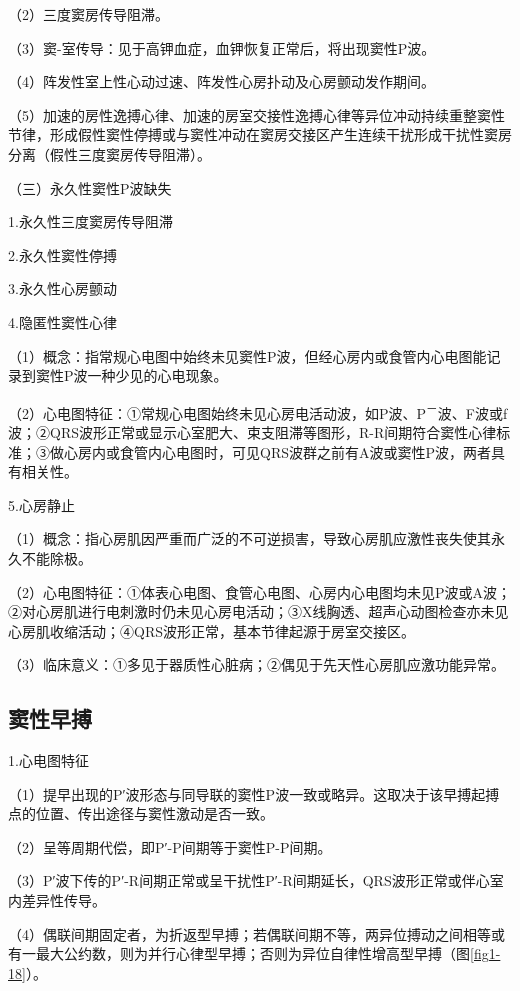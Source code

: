 （2）三度窦房传导阻滞。

（3）窦-室传导：见于高钾血症，血钾恢复正常后，将出现窦性P波。

（4）阵发性室上性心动过速、阵发性心房扑动及心房颤动发作期间。

（5）加速的房性逸搏心律、加速的房室交接性逸搏心律等异位冲动持续重整窦性节律，形成假性窦性停搏或与窦性冲动在窦房交接区产生连续干扰形成干扰性窦房分离（假性三度窦房传导阻滞）。

（三）永久性窦性P波缺失

1.永久性三度窦房传导阻滞

2.永久性窦性停搏

3.永久性心房颤动

4.隐匿性窦性心律

（1）概念：指常规心电图中始终未见窦性P波，但经心房内或食管内心电图能记录到窦性P波一种少见的心电现象。

（2）心电图特征：①常规心电图始终未见心房电活动波，如P波、P\textsuperscript{－}波、F波或f波；②QRS波形正常或显示心室肥大、束支阻滞等图形，R-R间期符合窦性心律标准；③做心房内或食管内心电图时，可见QRS波群之前有A波或窦性P波，两者具有相关性。

5.心房静止

（1）概念：指心房肌因严重而广泛的不可逆损害，导致心房肌应激性丧失使其永久不能除极。

（2）心电图特征：①体表心电图、食管心电图、心房内心电图均未见P波或A波；②对心房肌进行电刺激时仍未见心房电活动；③X线胸透、超声心动图检查亦未见心房肌收缩活动；④QRS波形正常，基本节律起源于房室交接区。

（3）临床意义：①多见于器质性心脏病；②偶见于先天性心房肌应激功能异常。

\protect\hypertarget{text00007.htmlux5cux23subid16}{}{}

\subsection{窦性早搏}

1.心电图特征

（1）提早出现的P′波形态与同导联的窦性P波一致或略异。这取决于该早搏起搏点的位置、传出途径与窦性激动是否一致。

（2）呈等周期代偿，即P′-P间期等于窦性P-P间期。

（3）P′波下传的P′-R间期正常或呈干扰性P′-R间期延长，QRS波形正常或伴心室内差异性传导。

（4）偶联间期固定者，为折返型早搏；若偶联间期不等，两异位搏动之间相等或有一最大公约数，则为并行心律型早搏；否则为异位自律性增高型早搏（图\ref{fig1-18}）。

